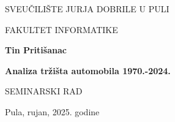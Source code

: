 \begin{center}
SVEUČILIŠTE JURJA DOBRILE U PULI 

FAKULTET INFORMATIKE

\vfill

\textbf{Tin Pritišanac}

\vspace{20mm} 

\textbf{Analiza tržišta automobila 1970.-2024.}

\vspace{5mm}
SEMINARSKI RAD

\vfill

Pula, rujan, 2025. godine
\end{center}
